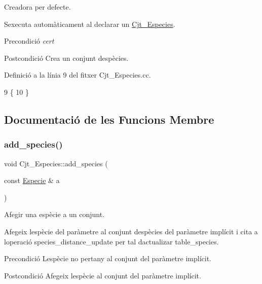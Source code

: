 Creadora per defecte. 

S\textquotesingle{}executa automàticament al declarar un \hyperlink{class_cjt___especies}{Cjt\+\_\+\+Especies}.

\begin{DoxyPrecond}{Precondició}
{\itshape cert} 
\end{DoxyPrecond}
\begin{DoxyPostcond}{Postcondició}
Crea un conjunt d\textquotesingle{}espècies. 
\end{DoxyPostcond}


Definició a la línia 9 del fitxer Cjt\+\_\+\+Especies.\+cc.


\begin{DoxyCode}
9                            \{
10 \}
\end{DoxyCode}


\subsection{Documentació de les Funcions Membre}
\mbox{\label{class_cjt___especies_ab0aafd7fe0f24410a24aec9ff934bce0}} 
\subsubsection{\texorpdfstring{add\+\_\+species()}{add\_species()}}
{\footnotesize\ttfamily void Cjt\+\_\+\+Especies\+::add\+\_\+species (\begin{DoxyParamCaption}\item[{const \hyperlink{class_especie}{Especie} \&}]{a }\end{DoxyParamCaption})}



Afegir una espècie a un conjunt. 

Afegeix l\textquotesingle{}espècie del paràmetre al conjunt d\textquotesingle{}espècies del paràmetre implícit i cita a l\textquotesingle{}operació species\+\_\+distance\+\_\+update per tal d\textquotesingle{}actualizar table\+\_\+species.

\begin{DoxyPrecond}{Precondició}
L\textquotesingle{}espècie no pertany al conjunt del paràmetre implícit. 
\end{DoxyPrecond}
\begin{DoxyPostcond}{Postcondició}
Afegeix l\textquotesingle{}espècie al conjunt del paràmetre implícit. 
\end{DoxyPostcond}


